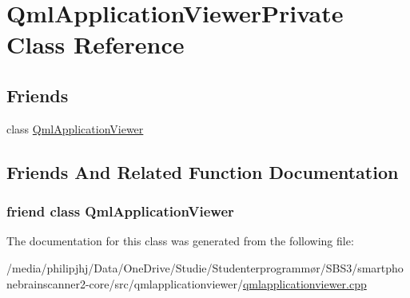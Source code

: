 \hypertarget{classQmlApplicationViewerPrivate}{\section{Qml\-Application\-Viewer\-Private Class Reference}
\label{classQmlApplicationViewerPrivate}
}
\subsection*{Friends}
\begin{DoxyCompactItemize}
\item 
class \hyperlink{classQmlApplicationViewerPrivate_a7f82e38d9994cdd669ba61d3c5a76ccf}{Qml\-Application\-Viewer}
\end{DoxyCompactItemize}


\subsection{Friends And Related Function Documentation}
\hypertarget{classQmlApplicationViewerPrivate_a7f82e38d9994cdd669ba61d3c5a76ccf}{
\subsubsection[{Qml\-Application\-Viewer}]{\setlength{\rightskip}{0pt plus 5cm}friend class {\bf Qml\-Application\-Viewer}\hspace{0.3cm}{\ttfamily [friend]}}}\label{classQmlApplicationViewerPrivate_a7f82e38d9994cdd669ba61d3c5a76ccf}


The documentation for this class was generated from the following file\-:\begin{DoxyCompactItemize}
\item 
/media/philipjhj/\-Data/\-One\-Drive/\-Studie/\-Studenterprogrammør/\-S\-B\-S3/smartphonebrainscanner2-\/core/src/qmlapplicationviewer/\hyperlink{qmlapplicationviewer_8cpp}{qmlapplicationviewer.\-cpp}\end{DoxyCompactItemize}
